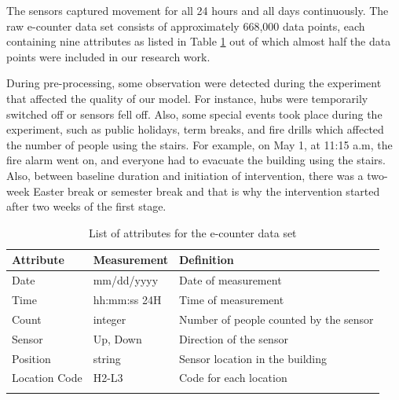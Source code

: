 The sensors captured movement for all 24 hours and all days continuously. The raw e-counter data set consists of approximately 668,000 data points, each containing nine attributes as listed in Table \ref{attr} out of which almost half the data points were included in our research work. 








During pre-processing, some observation were detected during the experiment that affected the quality of our model. For instance, hubs were temporarily switched off or sensors fell off. Also, some special events took place during the experiment, such as public holidays, term breaks, and fire drills which affected the number of people using the stairs. For example, on May 1, at 11:15 a.m, the fire alarm went on, and everyone had to evacuate the building using the stairs. Also, between baseline duration and initiation of intervention, there was a two-week Easter break or semester break and that is why the intervention started after two weeks of the first stage.



\begin{table}[!ht]
\centering
\caption{List of attributes for the e-counter data set}

    \begin{tabular}{p{2cm} p{3.5cm}  p{4.5cm} }
    \hline
    \textbf{Attribute} & \textbf{Measurement} & \textbf{Definition}\\ \hline
    \midrule
Date             &  mm/dd/yyyy      &   Date of measurement                                 \\\hline
Time             &  hh:mm:ss 24H    &   Time of measurement                                 \\\hline
Count            &  integer         &   Number of people counted by the sensor              \\ \hline
Sensor           &  Up, Down        & Direction of the sensor             \\ \hline
Position         &  string        &   Sensor location in the building                                                                                                      \\ \hline
Location Code    &     H2-L3             & Code for each location                                                                                                                                       \\ \hline
    \bottomrule
    \label{attr}
\end{tabular}
\end{table}



